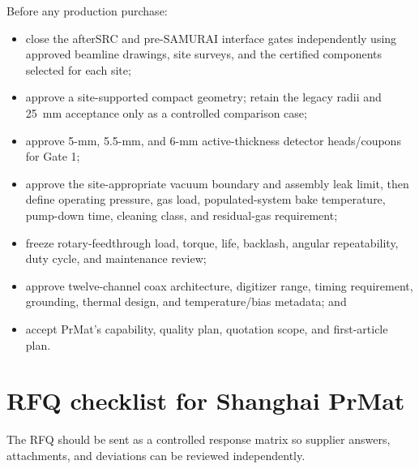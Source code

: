 \documentclass[10pt,letterpaper]{article}
\begin{document}
Before any production purchase:
\begin{itemize}
  \item close the afterSRC and pre-SAMURAI interface gates independently using approved
    beamline drawings, site surveys, and the certified components selected for each site;
  \item approve a site-supported compact geometry; retain the legacy radii and
    \SI{25}{\milli\meter} acceptance only as a controlled comparison case;
  \item approve 5-mm, 5.5-mm, and 6-mm active-thickness detector heads/coupons for Gate 1;
  \item approve the site-appropriate vacuum boundary and assembly leak limit, then define operating
    pressure, gas load, populated-system bake temperature, pump-down time, cleaning class,
    and residual-gas requirement;
  \item freeze rotary-feedthrough load, torque, life, backlash, angular repeatability,
    duty cycle, and maintenance review;
  \item approve twelve-channel coax architecture, digitizer range, timing requirement,
    grounding, thermal design, and temperature/bias metadata; and
  \item accept PrMat's capability, quality plan, quotation scope, and first-article plan.
\end{itemize}

\section{RFQ checklist for Shanghai PrMat}

The RFQ should be sent as a controlled response matrix so supplier answers, attachments,
and deviations can be reviewed independently.
\end{document}
